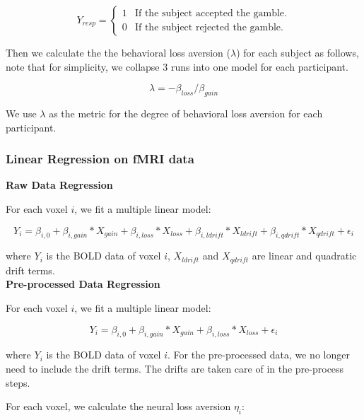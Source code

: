 \documentclass[11pt]{article}
\begin{document}
\begin{displaymath}
Y_{resp} = \left \{ \begin{array}{ll}
1 & \textrm{If the subject accepted the gamble.} \\
0 & \textrm{If the subject rejected the gamble.}
\end{array} \right .
\end{displaymath}

Then we calculate the the behavioral loss aversion ($ \lambda $) for each subject as follows, note that for simplicity, we collapse 3 runs into one model for each participant.

\begin{equation}
\lambda = -\beta_{loss} / \beta_{gain}
\end{equation}

We use $\lambda$ as the metric for the degree of behavioral loss aversion for each participant. 

\subsubsection{Linear Regression on fMRI data}

\textbf{Raw Data Regression}

For each voxel $i$, we fit a multiple linear model:

\begin{equation}
Y_{i} = \beta_{i, 0} + \beta_{i, gain} * X_{gain}  + \beta_{i, loss} *X_{loss} 
+ \beta_{i,ldrift} *X_{ldrift} + \beta_{i, qdrift} * X_{qdrift} 
+ \epsilon_i
\end{equation}

where $Y_{i}$ is the BOLD data of voxel $i$,  $X_{ldrift}$ and $X_{qdrift}$ are linear and quadratic drift terms. \\

\textbf{Pre-processed Data Regression}

For each voxel $i$, we fit a multiple linear model:

\begin{equation}
Y_{i} = \beta_{i, 0} + \beta_{i, gain} * X_{gain}  +  \beta_{i, loss} *X_{loss} + \epsilon_i
\end{equation}

where $Y_{i}$ is the BOLD data of voxel $i$.
For the pre-processed data, we no longer need to include the drift terms. The drifts are taken care of in the pre-process steps.

For each voxel, we calculate the 
neural loss aversion $\eta_i$:
\end{document}
